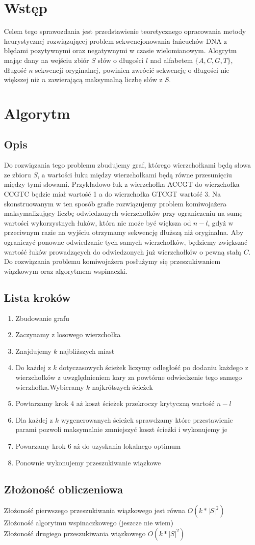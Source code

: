 \documentclass{article}
\begin{document}



\section{Wstęp}
Celem tego sprawozdania jest przedstawienie teoretycznego opracowania metody heurystycznej rozwiązującej problem sekwencjonowania łańcuchów DNA z błędami pozytywnymi oraz negatywnymi w czasie wielomianowym. Alogrytm mając dany na wejściu zbiór $S$ słów o długości $l$ nad alfabetem $\{A, C, G, T\}$, długość $n$ sekwencji oryginalnej, powinien zwrócić sekwencję o długości nie większej niż $n$ zawierającą maksymalną liczbę słów z $S$.

\section{Algorytm}
\subsection{Opis}
Do rozwiązania tego problemu zbudujemy graf, którego wierzchołkami będą słowa ze zbioru $S$, a wartości łuku między wierzchołkami będą równe przesunięciu między tymi słowami. Przykładowo łuk z wierzchołka ACCGT do wierzchołka CCGTC będzie miał wartość 1 a do wierzchołka GTCGT wartość 3. Na skonstruowanym w ten sposób grafie rozwiązujemy problem komiwojażera maksymalizujący liczbę odwiedzonych wierzchołków przy ograniczeniu na sumę wartości wykorzystnych łuków, która nie może być większa od $n - l$, gdyż w przeciwnym razie na wyjściu otrzymamy sekwencję dłuższą niż oryginalna.
Aby ograniczyć ponowne odwiedzanie tych samych wierzchołków, będziemy zwiększać wartość łuków prowadzących do odwiedzonych już wierzchołków o pewną stałą $C$.
Do rozwiązania problemu komiwojażera posłużymy się przeszukiwaniem wiązkowym oraz algorytmem wspinaczki.
\subsection{Lista kroków}
\begin{enumerate}
    \item Zbudowanie grafu
    \item Zaczynamy z losowego wierzchołka
    \item Znajdujemy $k$ najbliższych miast
    \item Do każdej z $k$ dotyczasowych ścieżek liczymy odległość po dodaniu każdego z wierzchołków z uwzględnieniem kary za powtórne odwiedzenie tego samego wierzhołka.Wybieramy $k$ najkrótszych ścieżek
    \item Powtarzamy krok 4 aż koszt ścieżek przekroczy krytyczną wartość $n-l$
    \item Dla każdej z $k$ wygenerowanych ścieżek sprawdzamy które przestawienie parami pozwoli maksymalnie zmniejszyć koszt ścieżki i wykonujemy je
    \item Powarzamy krok 6 aż do uzyskania lokalnego optimum
    \item Ponownie wykonujemy przeszukiwanie wiązkowe
\end{enumerate}
\subsection{Złożoność obliczeniowa}
Złożoność pierwszego przeszukiwania wiązkowego jest równa $O(k*|S|^2)$ \\
Złożoność algorytmu wspinaczkowego (jeszcze nie wiem) \\
Złożoność drugiego przeszukiwania wiązkowego $O(k*|S|^2)$
\end{document}

